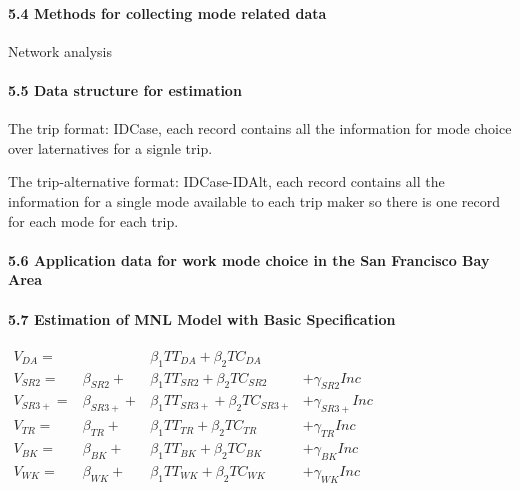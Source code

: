 \documentclass[
]{article}
\begin{document}
\hypertarget{methods-for-collecting-mode-related-data}{%
\paragraph{5.4 Methods for collecting mode related
data}\label{methods-for-collecting-mode-related-data}}

Network analysis

\hypertarget{data-structure-for-estimation}{%
\paragraph{5.5 Data structure for
estimation}\label{data-structure-for-estimation}}

The trip format: IDCase, each record contains all the information for
mode choice over laternatives for a signle trip.

The trip-alternative format: IDCase-IDAlt, each record contains all the
information for a single mode available to each trip maker so there is
one record for each mode for each trip.

\hypertarget{application-data-for-work-mode-choice-in-the-san-francisco-bay-area}{%
\paragraph{5.6 Application data for work mode choice in the San
Francisco Bay
Area}\label{application-data-for-work-mode-choice-in-the-san-francisco-bay-area}}

\hypertarget{estimation-of-mnl-model-with-basic-specification}{%
\paragraph{5.7 Estimation of MNL Model with Basic
Specification}\label{estimation-of-mnl-model-with-basic-specification}}

\(\begin{aligned} V_{DA}=& &\beta_1TT_{DA}+\beta_2TC_{DA}&\\ V_{SR2}=&\beta_{SR2}+&\beta_1TT_{SR2}+\beta_2TC_{SR2}&+\gamma_{SR2}Inc\\ V_{SR3+}=&\beta_{SR3+}+&\beta_1TT_{SR3+}+\beta_2TC_{SR3+}&+\gamma_{SR3+}Inc\\ V_{TR}=&\beta_{TR}+&\beta_1TT_{TR}+\beta_2TC_{TR}&+\gamma_{TR}Inc\\ V_{BK}=&\beta_{BK}+&\beta_1TT_{BK}+\beta_2TC_{BK}&+\gamma_{BK}Inc\\ V_{WK}=&\beta_{WK}+&\beta_1TT_{WK}+\beta_2TC_{WK}&+\gamma_{WK}Inc \end{aligned}\)
\end{document}
